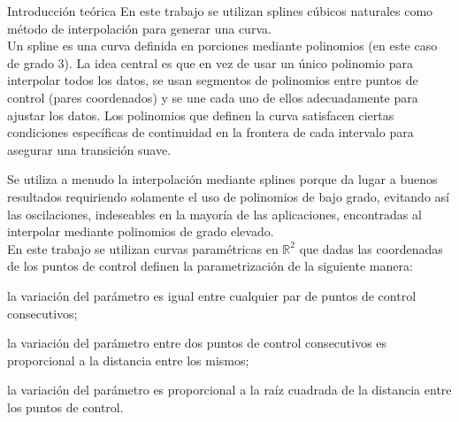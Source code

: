 \begin{section}{Introducción teórica}	
	 En este trabajo se utilizan splines cúbicos naturales como método de interpolación para generar una curva.\\
	 
	 Un spline es una curva definida en porciones mediante polinomios (en este caso de grado 3). La idea central es que en vez de usar un único polinomio para interpolar todos los datos,
	 se usan segmentos de polinomios entre puntos de control (pares coordenados) y se une cada uno de ellos adecuadamente para ajustar los datos.
	 Los polinomios que definen la curva satisfacen ciertas condiciones específicas de continuidad en la frontera de cada intervalo para asegurar una
	 transición suave.
	 
	 Se utiliza a menudo la interpolación mediante splines porque da lugar a buenos resultados requiriendo solamente el uso de polinomios de bajo grado,
	 evitando así las oscilaciones, indeseables en la mayoría de las aplicaciones, encontradas al interpolar mediante polinomios de grado elevado.\\
	 
	 En este trabajo se utilizan curvas paramétricas en $\mathbb{R}^2$ que dadas las coordenadas de los puntos de control definen la parametrización de la
	 siguiente manera:
	 
	 \begin{description}
		\setlength{\itemsep}{0pt}
		\setlength{\parskip}{0pt}
		\setlength{\parsep}{0pt}
		\item[Uniforme:] la variaci\'on del par\'ametro es igual entre cualquier par de puntos de control consecutivos;
		\item[\emph{Chord-length}:] la variaci\'on del par\'ametro entre dos puntos de control consecutivos es proporcional a la distancia entre los mismos;
		\item[Centr\'ipeta:] la variaci\'on del par\'ametro es proporcional a la ra\'iz cuadrada de la distancia entre los puntos de control.
	\end{description}
	 
\end{section}
